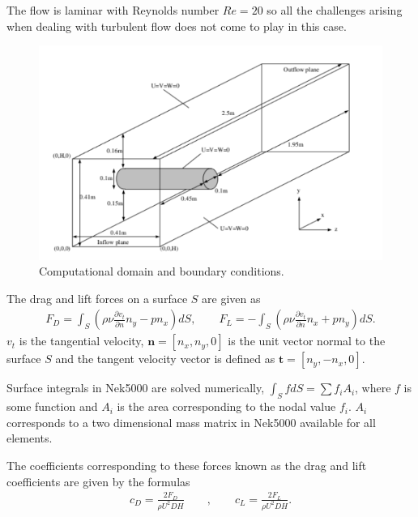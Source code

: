 The flow is laminar with Reynolds number $Re=20$ so all the 
challenges arising when dealing with turbulent flow does not come to play in this case. 
%
\begin{figure}[h]
    \centering
    \includegraphics[width = 1.0\textwidth]{Figures/cylinder.pdf}
    \caption{Computational domain and boundary conditions.}
    \label{fig:cylinder}
\end{figure}
%
The drag and lift forces on a surface $S$ are given as 
%
\begin{align}
    F_D = \int_{S}(\rho \nu \frac{\partial v_t}{\partial n}n_y-pn_x)dS, \qquad
    F_L = -\int_{S}(\rho \nu \frac{\partial v_t}{\partial n}n_x+pn_y)dS.
    \label{eq:dragnlift}
\end{align}
%
$v_t$ is the tangential velocity, $\mathbf{n}=[n_x,n_y,0]$ is the unit vector normal to the surface $S$ 
and the tangent velocity vector is defined as $\mathbf{t} = [n_y,-n_x,0]$.
 
Surface integrals in Nek5000 are solved numerically, $\int_S f dS = \sum f_i A_i$, where $f$ is some function and $A_i$ is the area corresponding
to the nodal value $f_i$. $A_i$ corresponds to a two dimensional mass matrix in Nek5000 available for all elements.

The coefficients corresponding to these forces known as the drag and lift coefficients 
are given by the formulas 
\begin{align}
    c_D = \frac{2F_D}{\rho U^2 D H}
    \qquad , \qquad
    c_L = \frac{2F_L}{\rho U^2 D H}.
    \label{eq:dragnliftcoeffs}
\end{align}


